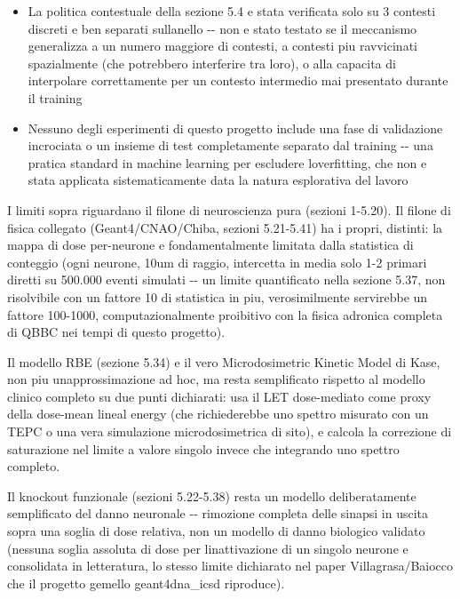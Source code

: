 \documentclass[
  italian,
]{article}
\begin{document}
\begin{itemize}
\item
  La politica contestuale della sezione 5.4 e\textquotesingle{} stata verificata solo su 3 contesti discreti e ben separati sull\textquotesingle anello -\/- non e\textquotesingle{} stato testato se il meccanismo generalizza a un numero maggiore di contesti, a contesti piu\textquotesingle{} ravvicinati spazialmente (che potrebbero interferire tra loro), o alla capacita\textquotesingle{} di interpolare correttamente per un contesto intermedio mai presentato durante il training
\item
  Nessuno degli esperimenti di questo progetto include una fase di validazione incrociata o un insieme di test completamente separato dal training -\/- una pratica standard in machine learning per escludere l\textquotesingle overfitting, che non e\textquotesingle{} stata applicata sistematicamente data la natura esplorativa del lavoro
\end{itemize}

I limiti sopra riguardano il filone di neuroscienza pura (sezioni 1-5.20). Il filone di fisica collegato (Geant4/CNAO/Chiba, sezioni 5.21-5.41) ha i propri, distinti: la mappa di dose per-neurone e\textquotesingle{} fondamentalmente limitata dalla statistica di conteggio (ogni neurone, 10um di raggio, intercetta in media solo 1-2 primari diretti su 500.000 eventi simulati -\/- un limite quantificato nella sezione 5.37, non risolvibile con un fattore 10 di statistica in piu\textquotesingle, verosimilmente servirebbe un fattore 100-1000, computazionalmente proibitivo con la fisica adronica completa di QBBC nei tempi di questo progetto).

Il modello RBE (sezione 5.34) e\textquotesingle{} il vero Microdosimetric Kinetic Model di Kase, non piu\textquotesingle{} un\textquotesingle approssimazione ad hoc, ma resta semplificato rispetto al modello clinico completo su due punti dichiarati: usa il LET dose-mediato come proxy della dose-mean lineal energy (che richiederebbe uno spettro misurato con un TEPC o una vera simulazione microdosimetrica di sito), e calcola la correzione di saturazione nel limite a valore singolo invece che integrando uno spettro completo.

Il knockout funzionale (sezioni 5.22-5.38) resta un modello deliberatamente semplificato del danno neuronale -\/- rimozione completa delle sinapsi in uscita sopra una soglia di dose relativa, non un modello di danno biologico validato (nessuna soglia assoluta di dose per l\textquotesingle inattivazione di un singolo neurone e\textquotesingle{} consolidata in letteratura, lo stesso limite dichiarato nel paper Villagrasa/Baiocco che il progetto gemello geant4dna\_\allowbreak{}icsd riproduce).
\end{document}
